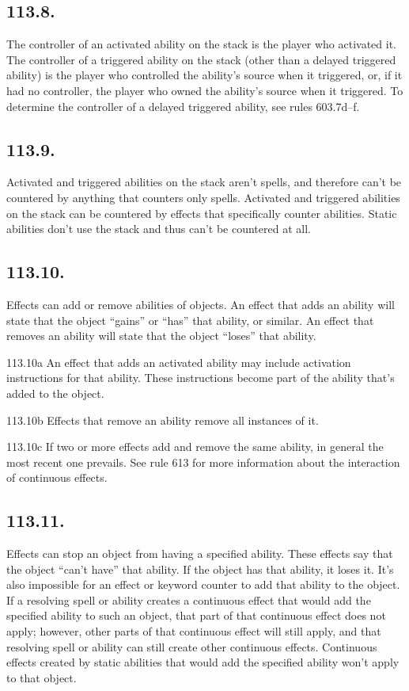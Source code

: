 \subsection*{113.8.}
The controller of an activated ability on the stack is the player who activated it. The controller of a triggered ability on the stack (other than a delayed triggered ability) is the player who controlled the ability’s source when it triggered, or, if it had no controller, the player who owned the ability’s source when it triggered. To determine the controller of a delayed triggered ability, see rules 603.7d–f.

\subsection*{113.9.}
Activated and triggered abilities on the stack aren’t spells, and therefore can’t be countered by anything that counters only spells. Activated and triggered abilities on the stack can be countered by effects that specifically counter abilities. Static abilities don’t use the stack and thus can’t be countered at all.

\subsection*{113.10.}
Effects can add or remove abilities of objects. An effect that adds an ability will state that the object “gains” or “has” that ability, or similar. An effect that removes an ability will state that the object “loses” that ability.

113.10a An effect that adds an activated ability may include activation instructions for that ability. These instructions become part of the ability that’s added to the object.

113.10b Effects that remove an ability remove all instances of it.

113.10c If two or more effects add and remove the same ability, in general the most recent one prevails. See rule 613 for more information about the interaction of continuous effects.

\subsection*{113.11.}
Effects can stop an object from having a specified ability. These effects say that the object “can’t have” that ability. If the object has that ability, it loses it. It’s also impossible for an effect or keyword counter to add that ability to the object. If a resolving spell or ability creates a continuous effect that would add the specified ability to such an object, that part of that continuous effect does not apply; however, other parts of that continuous effect will still apply, and that resolving spell or ability can still create other continuous effects. Continuous effects created by static abilities that would add the specified ability won’t apply to that object.

